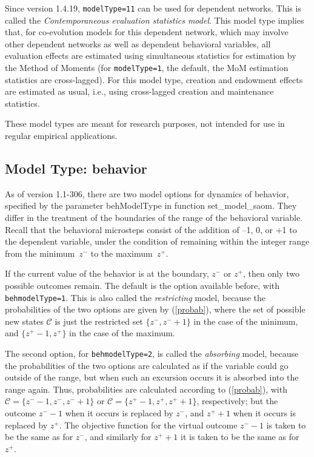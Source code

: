 \documentclass[a4paper,fleqn,11pt]{article}
\newcommand{\+}{\, + \,}
\newcommand{\sfn}[1]{\textsf{#1}}
\begin{document}
Since version 1.4.19,  \texttt{modelType=11} can be used for dependent
networks. This is called the
\emph{Contemporaneous evaluation statistics model}.
This model type implies that, for co-evolution models for this dependent network,
which may involve other dependent networks as well as dependent behavioral
variables, all evaluation effects are estimated using simultaneous statistics
for estimation by the Method of Moments
(for \texttt{modelType=1}, the default, the MoM estimation statistics
are cross-lagged).
For this model type, creation and endowment effects are estimated as usual,
i.e., using cross-lagged creation and maintenance statistics.
\medskip

These model types are meant for research purposes,
not intended for use in regular empirical applications.


\subsection{Model Type: behavior}
\label{S_modeltype_beh}

As of version 1.1-306, there are two model options for dynamics
of behavior, specified by the parameter \sfn{behModelType} in function
\textsf{set\_model\_saom}.
They differ in the treatment of the boundaries of the range of
the behavioral variable.
Recall that the behavioral microsteps consist of the addition
of --1, 0, or +1 to the dependent variable, under the condition
of remaining within the integer range from the minimum~$z^-$ to
the maximum~$z^+$.

If the current value of the behavior is at the boundary,
$z^-$ or $z^+$, then only two possible outcomes remain.
The default is the option available before, with
\texttt{behmodelType=1}. This is also called the \emph{restricting}
model, because the probabilities of the two options are given by
(\ref{probab}), where the set of possible new states
$\mathcal C$ is just the restricted set $\{z^-, z^-+1\}$ in the case
of the minimum, and $\{z^+-1, z^+\}$ in the case of the maximum.

The second option, for
\texttt{behmodelType=2}, is called the \emph{absorbing}
model, because the probabilities of the two options are calculated
as if the variable could go outside of the range, but when such an excursion
occurs it is absorbed into the range again.
Thus, probabilities are calculated according to
(\ref{probab}), with
$\mathcal C = \{z^--1, z^-, z^-+1\}$ or
$\mathcal C = \{z^+-1, z^+, z^++1\}$,
respectively; but the outcome $z^--1$ when it occurs is replaced
by $z^-$, and  $z^++1$ when it occurs is replaced
by $z^+$.
The objective function for the virtual outcome $z^--1$
is taken to be the same as for $z^-$, and similarly for $z^++1$
it is taken to be the same as for $z^+$.
\end{document}
